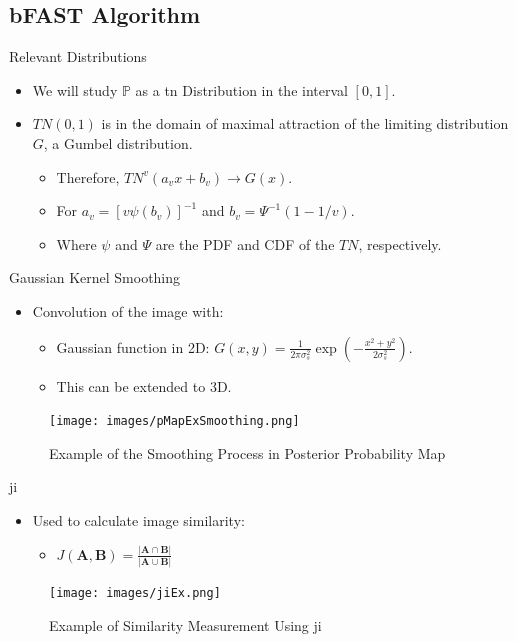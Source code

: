 \documentclass{beamer}
\begin{document}
\subsection{bFAST Algorithm}

\begin{frame}{Relevant Distributions}
\begin{itemize}
\item We will study $\bm{\mathbb{P}}$ as a \gls{tn} Distribution 
in the interval $[0,1]$.
\item $TN(0,1)$ is in the domain of maximal attraction of the limiting 
distribution $G$, a Gumbel distribution.
\begin{itemize}
\item Therefore, $TN^v(a_vx+b_v) \rightarrow G(x)$.
\item For $a_v = \left[ v \psi (b_v) \right]^{-1}$ and $b_v = \Psi^{-1}(1-1/v)$.
\item Where $\psi$ and $\Psi$ are the PDF and CDF of the $TN$, respectively.
\end{itemize}
\end{itemize}
\end{frame}

\begin{frame}{Gaussian Kernel Smoothing}
\begin{itemize}
\item Convolution of the image with:
\begin{itemize}
\item Gaussian function in 2D: 
$G(x,y) = \frac{1}{2\pi\sigma_{s}^2} \exp \left( -\frac{x^2+y^2}{2\sigma_{s}^2} \right)$.
\item This can be extended to 3D.
\end{itemize}
\end{itemize}
\begin{figure}
\centering
\texttt{[image: images/pMapExSmoothing.png]}
\caption{Example of the Smoothing Process in Posterior Probability Map}
\end{figure}
\end{frame}

\begin{frame}{\acrfull{ji}}
\begin{itemize}
\item Used to calculate image similarity:
\begin{itemize}
\item $ J(\bm{A},\bm{B}) = \frac{|\bm{A} \cap \bm{B}|}{|\bm{A} \cup \bm{B}|} $
\end{itemize}
\end{itemize}
\begin{figure}
\centering
\texttt{[image: images/jiEx.png]}
\caption{Example of Similarity Measurement Using \acrshort{ji}}
\end{figure}
\end{frame}
\end{document}
